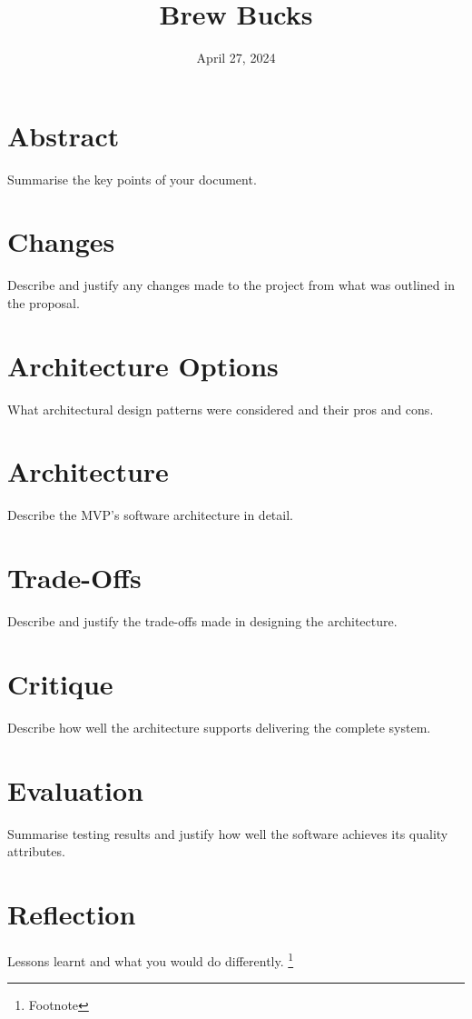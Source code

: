 \documentclass{article}
\title{Brew Bucks}
\date{April 27, 2024}
\begin{document}
\maketitle
\pagebreak

\tableofcontents
\pagebreak

\section{Abstract}
Summarise the key points of your document.
\section{Changes}
Describe and justify any changes made to the project from what was outlined in the proposal.
\section{Architecture Options}
What architectural design patterns were considered and their pros and cons.
\section{Architecture}
Describe the MVP’s software architecture in detail.
\section{Trade-Offs}
Describe and justify the trade-offs made in designing the architecture.
\section{Critique}
Describe how well the architecture supports delivering the complete system.
\section{Evaluation}
Summarise testing results and justify how well the software achieves its quality attributes.
\section{Reflection}
Lessons learnt and what you would do differently.
\footnote{Footnote}
\end{document}

